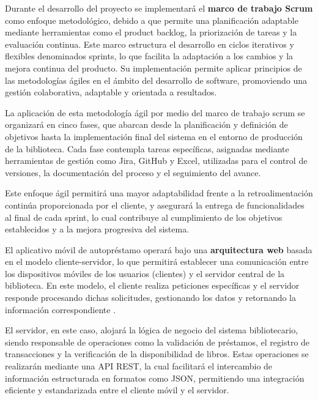 \documentclass[spanish]{ieee_upb}
\begin{document}
Durante el desarrollo del proyecto se implementará el \textbf{marco de trabajo Scrum} como enfoque metodológico, debido a que permite una planificación adaptable mediante herramientas como el product backlog, la priorización de tareas y la evaluación continua. Este marco estructura el desarrollo en ciclos iterativos y flexibles denominados sprints, lo que facilita la adaptación a los cambios y la mejora continua del producto\cite{schwaber2020guia}. Su implementación permite aplicar principios de las metodologías ágiles en el ámbito del desarrollo de software, promoviendo una gestión colaborativa, adaptable y orientada a resultados.\vspace{0.3 cm}

La aplicación de esta metodología ágil por medio del marco de trabajo scrum se organizará en cinco fases, que abarcan desde la planificación y definición de objetivos hasta la implementación final del sistema en el entorno de producción de la biblioteca. Cada fase contempla tareas específicas, asignadas mediante herramientas de gestión como Jira, GitHub y Excel, utilizadas para el control de versiones, la documentación del proceso y el seguimiento del avance.\vspace{0.3 cm}

Este enfoque ágil permitirá una mayor adaptabilidad frente a la retroalimentación continúa proporcionada por el cliente, y asegurará la entrega de funcionalidades al final de cada sprint, lo cual contribuye al cumplimiento de los objetivos establecidos y a la mejora progresiva del sistema.\vspace{0.3 cm}

El aplicativo móvil de autopréstamo operará bajo una \textbf{arquitectura web} basada en el modelo cliente-servidor, lo que permitirá establecer una comunicación entre los dispositivos móviles de los usuarios (clientes) y el servidor central de la biblioteca. En este modelo, el cliente realiza peticiones específicas y el servidor responde procesando dichas solicitudes, gestionando los datos y retornando la información correspondiente \cite{guillen2019arquitectura}. \vspace{0.3 cm}

El servidor, en este caso, alojará la lógica de negocio del sistema bibliotecario, siendo responsable de operaciones como la validación de préstamos, el registro de transacciones y la verificación de la disponibilidad de libros. Estas operaciones se realizarán mediante una API REST, la cual facilitará el intercambio de información estructurada en formatos como JSON, permitiendo una integración eficiente y estandarizada entre el cliente móvil y el servidor.\vspace{0.3 cm}
\end{document}
